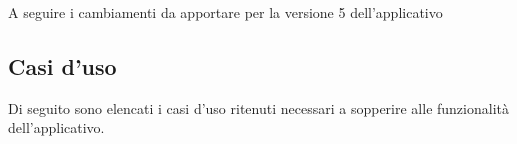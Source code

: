A seguire i cambiamenti da apportare per la versione 5 dell'applicativo

\subsection{Casi d'uso}
Di seguito sono elencati i casi d'uso ritenuti necessari a sopperire alle funzionalità
dell'applicativo.
\\\\
%

\pagebreak
